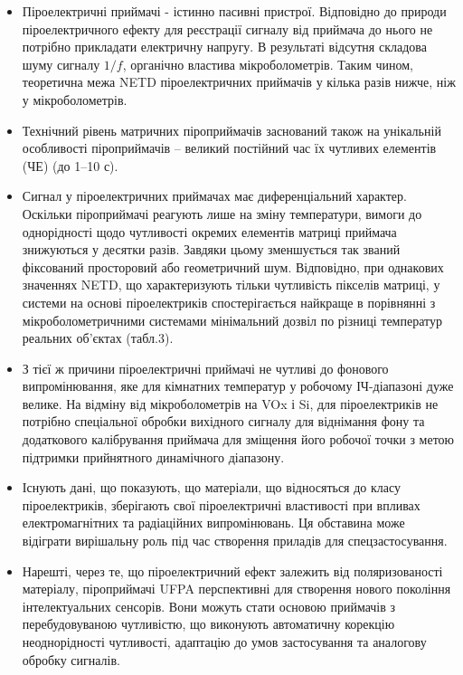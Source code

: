 \documentclass[a4paper,14pt]{extreport}
\begin{document}
\begin{itemize}


\item Піроелектричні приймачі - істинно пасивні пристрої.
Відповідно до природи піроелектричного ефекту для реєстрації
сигналу від приймача до нього не потрібно прикладати електричну напругу. В результаті відсутня складова шуму сигналу $1/f$, органічно властива мікроболометрів. Таким чином, теоретична межа NETD піроелектричних приймачів
у кілька разів нижче, ніж у мікроболометрів.
\item Технічний рівень матричних піроприймачів заснований також
на унікальній особливості піроприймачів – великий постійний час їх чутливих елементів (ЧЕ) (до 1–10 с).
\item Сигнал у піроелектричних приймачах має диференціальний характер. Оскільки піроприймачі реагують лише на зміну температури, вимоги до однорідності щодо чутливості окремих елементів матриці приймача знижуються у десятки разів. Завдяки цьому зменшується так званий фіксований просторовий або геометричний шум. Відповідно, при однакових значеннях NETD, що характеризують
тільки чутливість пікселів матриці, у системи на основі
піроелектриків спостерігається найкраще в порівнянні з мікроболометричними системами мінімальний дозвіл по різниці
температур реальних об'єктах (табл.3).
\item З тієї ж причини піроелектричні приймачі не чутливі до фонового випромінювання, яке для кімнатних температур
у робочому ІЧ-діапазоні дуже велике. На відміну від мікроболометрів на VOx і Si, для піроелектриків не потрібно спеціальної
обробки вихідного сигналу для віднімання фону та додаткового калібрування приймача для зміщення його робочої точки з метою підтримки прийнятного динамічного діапазону.
\item Існують дані, що показують, що матеріали, що відносяться
до класу піроелектриків, зберігають свої піроелектричні
властивості при впливах електромагнітних та радіаційних
випромінювань. Ця обставина може відіграти вирішальну роль
під час створення приладів для спецзастосування.
\item Нарешті, через те, що піроелектричний ефект залежить від поляризованості матеріалу, піроприймачі UFPA перспективні для створення нового покоління інтелектуальних сенсорів. Вони
можуть стати основою приймачів з перебудовуваною чутливістю, що виконують автоматичну корекцію неоднорідності чутливості, адаптацію до умов застосування та аналогову обробку сигналів.
\end{itemize}
\end{document}
